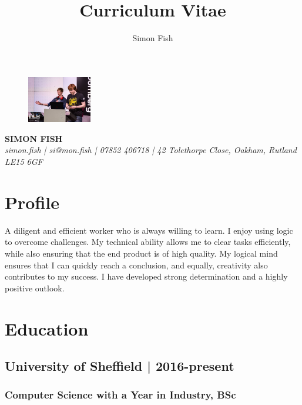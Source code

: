 \documentclass{article}
\begin{document}
\title{Curriculum Vitae}
\author{Simon Fish}

\begin{figure}
			           \centering
				       \includegraphics[width=0.25\textwidth]{profile}
		       \end{figure}

   \begin{center}
	         \color[HTML]{008080}\selectfont\MakeTextUppercase\Large\textbf{SIMON FISH}\\
		       \small\textit{simon.fish | si@mon.fish | 07852 406718 | 42 Tolethorpe Close, Oakham, Rutland LE15 6GF}
		          \end{center}

\section*{Profile}
A diligent and efficient worker who is always willing to learn. I enjoy using logic to
overcome challenges. My technical ability allows me to clear tasks efficiently,
while also ensuring that the end product is of high quality. My logical mind
ensures that I can quickly reach a conclusion, and equally, creativity also
contributes to my success. I have developed strong determination and a highly
positive outlook.

\section*{Education}
\subsection*{University of Sheffield | 2016-present}
\subsubsection*{Computer Science with a Year in Industry, BSc}
\end{document}
